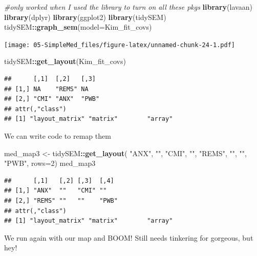 \documentclass[
  11pt,
]{book}
\newenvironment{Shaded}{\begin{snugshade}}{\end{snugshade}}
\newcommand{\AttributeTok}[1]{\textcolor[rgb]{0.27,0.27,0.27}{#1}}
\newcommand{\CommentTok}[1]{\textcolor[rgb]{0.37,0.37,0.37}{\textit{#1}}}
\newcommand{\DecValTok}[1]{\textcolor[rgb]{0.06,0.06,0.06}{#1}}
\newcommand{\FunctionTok}[1]{\textcolor[rgb]{0.27,0.27,0.27}{\textbf{#1}}}
\newcommand{\NormalTok}[1]{#1}
\newcommand{\OtherTok}[1]{\textcolor[rgb]{0.37,0.37,0.37}{#1}}
\newcommand{\SpecialCharTok}[1]{\textcolor[rgb]{0.43,0.43,0.43}{\textbf{#1}}}
\newcommand{\StringTok}[1]{\textcolor[rgb]{0.5,0.5,0.5}{#1}}
\begin{document}
\begin{Shaded}
\begin{Highlighting}[]
\CommentTok{\#only worked when I used the library to turn on all these pkgs}
\FunctionTok{library}\NormalTok{(lavaan)}
\FunctionTok{library}\NormalTok{(dplyr)}
\FunctionTok{library}\NormalTok{(ggplot2)}
\FunctionTok{library}\NormalTok{(tidySEM)}
\NormalTok{tidySEM}\SpecialCharTok{::}\FunctionTok{graph\_sem}\NormalTok{(}\AttributeTok{model=}\NormalTok{Kim\_fit\_covs)}
\end{Highlighting}
\end{Shaded}

\texttt{[image: 05-SimpleMed\_files/figure-latex/unnamed-chunk-24-1.pdf]}

\begin{Shaded}
\begin{Highlighting}[]
\NormalTok{tidySEM}\SpecialCharTok{::}\FunctionTok{get\_layout}\NormalTok{(Kim\_fit\_covs)}
\end{Highlighting}
\end{Shaded}

\begin{verbatim}
##      [,1]  [,2]   [,3] 
## [1,] NA    "REMS" NA   
## [2,] "CMI" "ANX"  "PWB"
## attr(,"class")
## [1] "layout_matrix" "matrix"        "array"
\end{verbatim}

We can write code to remap them

\begin{Shaded}
\begin{Highlighting}[]
\NormalTok{med\_map3 }\OtherTok{\textless{}{-}}\NormalTok{ tidySEM}\SpecialCharTok{::}\FunctionTok{get\_layout}\NormalTok{(}
                                \StringTok{"ANX"}\NormalTok{, }\StringTok{""}\NormalTok{,   }\StringTok{"CMI"}\NormalTok{,  }\StringTok{""}\NormalTok{,}
                               \StringTok{"REMS"}\NormalTok{, }\StringTok{""}\NormalTok{,  }\StringTok{""}\NormalTok{,    }\StringTok{"PWB"}\NormalTok{, }\AttributeTok{rows=}\DecValTok{2}\NormalTok{)}
\NormalTok{med\_map3}
\end{Highlighting}
\end{Shaded}

\begin{verbatim}
##      [,1]   [,2] [,3]  [,4] 
## [1,] "ANX"  ""   "CMI" ""   
## [2,] "REMS" ""   ""    "PWB"
## attr(,"class")
## [1] "layout_matrix" "matrix"        "array"
\end{verbatim}

We run again with our map and BOOM! Still needs tinkering for gorgeous, but hey!
\end{document}
